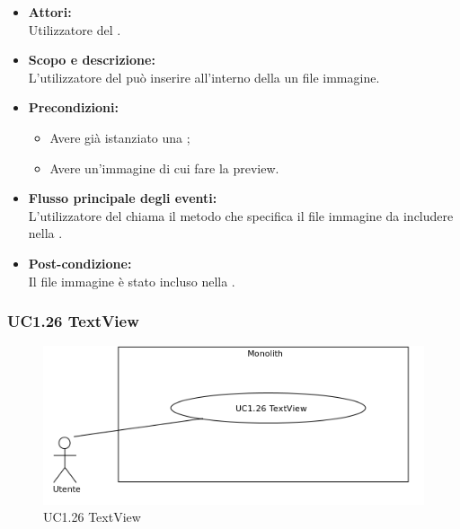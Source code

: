 \begin{itemize}
	\item \textbf{Attori:}
	\\Utilizzatore del .
	\item \textbf{Scopo e descrizione:} 
	\\L'utilizzatore del  può inserire all'interno della  un file immagine.
	\item \textbf{Precondizioni:}
	\begin{itemize}
		\item Avere già istanziato una ;
		\item Avere un'immagine di cui fare la preview.
	\end{itemize}
	\item \textbf{Flusso principale degli eventi:}
	\\L'utilizzatore del  chiama il metodo che specifica il file immagine da includere nella .
	\item \textbf{Post-condizione:}
	\\Il file immagine è stato incluso nella .
\end{itemize}

\subsubsection{UC1.26 TextView} \label{UC1.26}

\begin{figure}[H]
	\centering
	\includegraphics[width=15cm]{../../documenti/AnalisiDeiRequisiti/Diagrammi_img/uc1_26.png}
	\caption{UC1.26 TextView}
\end{figure}

